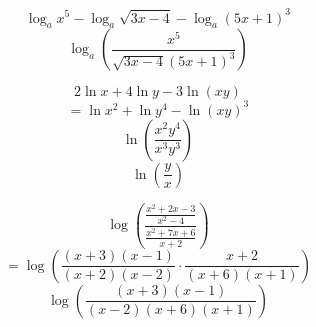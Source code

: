 \documentclass{report}
\begin{document}
$$
\log_{a}x^{5}-\log _a \sqrt{3 x-4}-\log _a(5 x+1)^3
$$
$$
\boxed{\log _a\left(\frac{x^5}{\sqrt{3 x-4}(5 x+1)^3}\right)}
$$
\bigbreak \noindent
{}

$$
2 \ln x+4 \ln y-3 \ln (x y)
$$
$$
=\ln x^2+\ln y^4-\ln (x y)^3
$$
$$
\ln \left(\frac{x^2 y^4}{x^3 y^3}\right)
$$
$$
\boxed{\ln \left(\frac{y}{x}\right)}
$$
\bigbreak \noindent 


$$
\log \left(\frac{\frac{x^2+2 x-3}{x^2-4}}{\frac{x^2+7 x+6}{x+2}}\right)
$$
$$
=\log \left(\frac{(x+3)(x-1)}{(x+2)(x-2)} \cdot \frac{x+2}{(x+6)(x+1)}\right)
$$
$$
\log \left(\frac{(x+3)(x-1)}{(x-2)(x+6)(x+1)}\right)
$$
\end{document}
